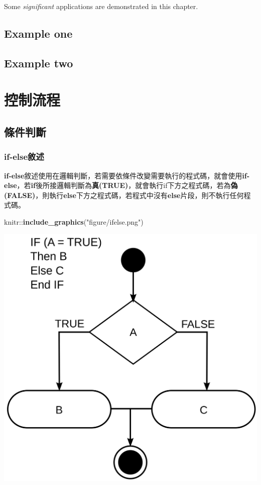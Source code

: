 \documentclass[]{book}
\newenvironment{Shaded}{\begin{snugshade}}{\end{snugshade}}
\newcommand{\KeywordTok}[1]{\textcolor[rgb]{0.13,0.29,0.53}{\textbf{{#1}}}}
\newcommand{\StringTok}[1]{\textcolor[rgb]{0.31,0.60,0.02}{{#1}}}
\newcommand{\NormalTok}[1]{{#1}}
\theoremstyle{definition}
\theoremstyle{definition}
\theoremstyle{remark}
\begin{document}
Some \emph{significant} applications are demonstrated in this chapter.

\section{Example one}\label{example-one}

\section{Example two}\label{example-two}

\chapter{控制流程}\label{controlstructure}

\section{條件判斷}

\subsection{if-else敘述}\label{if-else}

\textbf{if-else}敘述使用在邏輯判斷，若需要依條件改變需要執行的程式碼，就會使用\textbf{if-else}，若\textbf{if}後所接邏輯判斷為\textbf{真(TRUE)}，就會執行if下方之程式碼，若為\textbf{偽(FALSE)}，則執行\textbf{else}下方之程式碼，若程式中沒有\textbf{else}片段，則不執行任何程式碼。

\begin{Shaded}
\begin{Highlighting}[]
\NormalTok{knitr::}\KeywordTok{include_graphics}\NormalTok{(}\StringTok{"figure/ifelse.png"}\NormalTok{)}
\end{Highlighting}
\end{Shaded}

\includegraphics{figure/ifelse.png}
\end{document}
